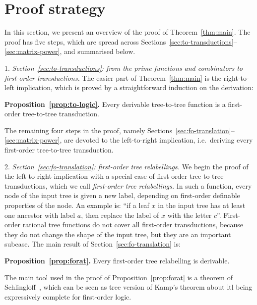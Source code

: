 \section{Proof strategy}
\label{sec:strategy}
In this section, we present an overview of the proof of Theorem~\ref{thm:main}. The proof has five steps, which are spread across Sections~\ref{sec:to-transductions}--\ref{sec:matrix-power}, and summarised below.

\newcommand{\announce}[2]{
\begin{center}
    {\bf #1.} #2
\end{center}
}

1. \emph{Section~\ref{sec:to-transductions}: from the prime functions and combinators to first-order transductions.} The easier part of Theorem~\ref{thm:main} is the  right-to-left implication, which is proved by a straightforward induction on the derivation:
\announce
{Proposition~\ref{prop:to-logic}}
{Every derivable tree-to-tree function is a first-order tree-to-tree transduction.}
 
 The remaining four steps in the proof, namely Sections~\ref{sec:fo-translation}--\ref{sec:matrix-power}, are devoted to the left-to-right implication, i.e.~deriving every first-order tree-to-tree transduction.

\smallskip
  2. \emph{Section~\ref{sec:fo-translation}: first-order tree relabellings.} We begin the proof of the left-to-right  implication  with a special case of first-order tree-to-tree transductions, which we call \emph{first-order  tree relabellings.} In such a  function, every node of the input tree  is given a new label, depending on first-order definable properties of the node. An example is:  ``if a leaf $x$ in the input tree has at least one ancestor with label $a$, then replace the label of $x$ with the letter $c$''. First-order rational tree functions do not cover all first-order transductions, because they do not change the shape of the input tree, but they are an important subcase.
    The main result of Section~\ref{sec:fo-translation} is:
    \announce
    {Proposition~\ref{prop:forat}}
    {Every first-order tree relabelling is derivable.}
    The main tool used in the proof of Proposition~\ref{prop:forat} is a theorem of Schlingloff~\cite[Theorem 2.6]{schlingloff1992expressive}, which can be seen as tree version of Kamp's theorem about {\sc ltl} being  expressively complete for first-order logic.  
    
